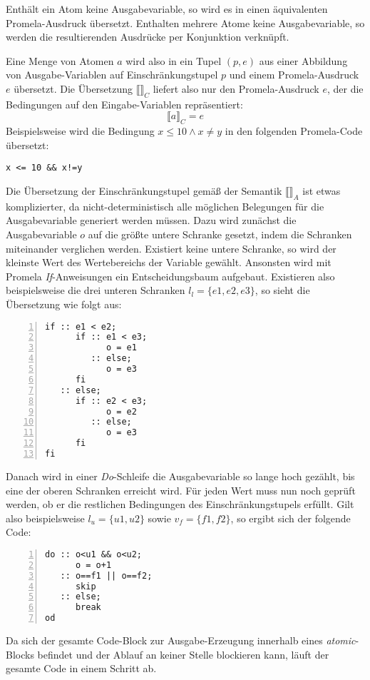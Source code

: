 Enthält ein Atom keine Ausgabevariable, so wird es in einen äquivalenten Promela-Ausdruck übersetzt.
Enthalten mehrere Atome keine Ausgabevariable, so werden die resultierenden Ausdrücke per Konjunktion verknüpft.

Eine Menge von Atomen $a$ wird also in ein Tupel $(p,e)$ aus einer Abbildung von Ausgabe-Variablen auf Einschränkungstupel $p$ und einem Promela-Ausdruck $e$ übersetzt.
Die Übersetzung $\llbracket \rrbracket_C$ liefert also nur den Promela-Ausdruck $e$, der die Bedingungen auf den Eingabe-Variablen repräsentiert:
\[ \llbracket a\rrbracket_C = e \]
Beispielsweise wird die Bedingung $x\leq 10\land x\neq y$ in den folgenden Promela-Code übersetzt:
\begin{lstlisting}[language=promela]
  x <= 10 && x!=y
\end{lstlisting}

Die Übersetzung der Einschränkungstupel gemäß der Semantik $\llbracket\rrbracket_A$ ist etwas komplizierter, da nicht-deterministisch alle möglichen Belegungen für die Ausgabevariable generiert werden müssen.
Dazu wird zunächst die Ausgabevariable $o$ auf die größte untere Schranke gesetzt, indem die Schranken miteinander verglichen werden.
Existiert keine untere Schranke, so wird der kleinste Wert des Wertebereichs der Variable gewählt.
Ansonsten wird mit Promela \emph{If}-Anweisungen ein Entscheidungsbaum aufgebaut.
Existieren also beispielsweise die drei unteren Schranken $l_l = \{ e1,e2,e3\}$, so sieht die Übersetzung wie folgt aus:
\begin{lstlisting}[language=promela,numbers=left,caption={Berechnung der unteren Schranke}]
if :: e1 < e2;
      if :: e1 < e3;
            o = e1
         :: else;
            o = e3
      fi
   :: else;
      if :: e2 < e3;
            o = e2
         :: else;
            o = e3
      fi
fi
\end{lstlisting}
Danach wird in einer \emph{Do}-Schleife die Ausgabevariable so lange hoch gezählt, bis eine der oberen Schranken erreicht wird.
Für jeden Wert muss nun noch geprüft werden, ob er die restlichen Bedingungen des Einschränkungstupels erfüllt.
Gilt also beispielsweise $l_u = \{ u1,u2 \}$ sowie $v_f=\{ f1, f2 \}$, so ergibt sich der folgende Code:
\begin{lstlisting}[language=promela,numbers=left,firstnumber=last,caption={Generierung von möglichen Werten}]
do :: o<u1 && o<u2;
      o = o+1
   :: o==f1 || o==f2;
      skip
   :: else;
      break
od
\end{lstlisting}
Da sich der gesamte Code-Block zur Ausgabe-Erzeugung innerhalb eines \emph{atomic}-Blocks befindet und der Ablauf an keiner Stelle blockieren kann, läuft der gesamte Code in einem Schritt ab.

